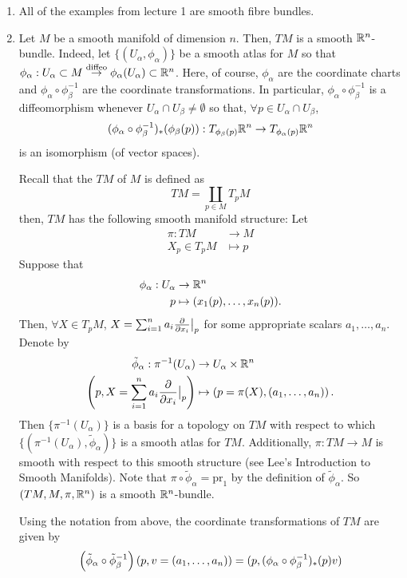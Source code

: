 \documentclass[main.tex]{subfiles}
\begin{document}
\begin{exmp}
\begin{enumerate}
    \item All of the examples from lecture 1 are smooth fibre bundles.
    \item {} Let $M$ be a smooth manifold of dimension $n$. Then, $TM$ is a smooth $\mathbb{R}^n$-bundle. Indeed, let $\{(U_\alpha, \phi_\alpha) \}$ be a smooth atlas for $M$ so that $\phi_\alpha: U_\alpha \subset M \overset{\text{diffeo}}{\to} \phi_\alpha(U_\alpha) \subset \mathbb{R}^n$. Here, of course, $\phi_\alpha$ are the coordinate charts and $\phi_\alpha \circ \phi_\beta^{-1}$ are the coordinate transformations. In particular, $\phi_\alpha \circ \phi_\beta^{-1}$ is a diffeomorphism whenever $U_\alpha \cap U_\beta \neq \emptyset$ so that, $\forall p \in U_\alpha \cap U_\beta$,
    \begin{align*}
        (\phi_\alpha \circ \phi_\beta^{-1})_*(\phi_\beta(p)): T_{\phi_\beta(p)}\mathbb{R}^n \to T_{\phi_\alpha(p)}\mathbb{R}^n
    \end{align*}is an isomorphism (of vector spaces).
    
    Recall that the  $TM$ of $M$ is defined as
    \[
    TM = \coprod_{p \in M} T_pM
    \]
    then, $TM$ has the following smooth manifold structure: Let
    \begin{align*}
        \pi: TM &\to M \\
            X_p \in T_pM &\mapsto p
    \end{align*}
    Suppose that
    \begin{align*}
        \phi_\alpha: U_\alpha &\to \mathbb{R}^n \\
                        p &\mapsto (x_1(p), \dots, x_n(p)).
    \end{align*}
    Then, $\forall X \in T_pM$, $X = \sum_{i=1}^n a_i \frac{\partial}{\partial x_i}\big|_{p}$ for some appropriate scalars $a_1, \dots, a_n$.
    Denote by
    \begin{align*}
        \tilde{\phi}_\alpha: \pi^{-1}(U_\alpha) &\to U_\alpha \times \mathbb{R}^n \\ 
                            \left( p, X = \sum_{i=1}^n a_i \frac{\partial}{\partial x_i}\big|_{p} \right) &\mapsto \left( p = \pi(X), (a_1, \dots, a_n) \right).
    \end{align*}
    Then $\{ \pi^{-1}(U_\alpha)\}$ is a basis for a topology on $TM$ with respect to which $\{(\pi^{-1}(U_\alpha), \tilde{\phi}_\alpha) \}$ is a smooth atlas for $TM$. Additionally, $\pi: TM \to M$ is smooth with respect to this smooth structure (see Lee's Introduction to Smooth Manifolds). Note that $\pi \circ \tilde{\phi}_\alpha = \text{pr}_1$ by the definition of $\tilde{\phi}_\alpha$. So $(TM, M, \pi, \mathbb{R}^n)$ is a smooth $\mathbb{R}^n$-bundle.
    
    \begin{note}
    Using the notation from above, the coordinate transformations of $TM$ are given by
    \[
    \left( \tilde{\phi}_\alpha \circ \tilde{\phi}_\beta^{-1} \right)(p, v = (a_1, \dots, a_n)) = (p, (\phi_\alpha \circ \phi_\beta^{-1})_*(p)v)
    \]
    \end{note}
\end{enumerate}
\end{exmp}
\end{document}
